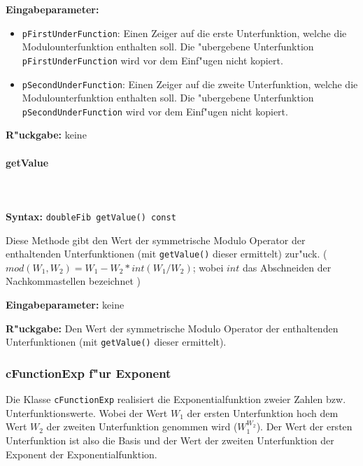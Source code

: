 \bigskip\noindent
\textbf{Eingabeparameter:}
\begin{itemize}
 \item \verb|pFirstUnderFunction|: Einen Zeiger auf die erste Unterfunktion, welche die Modulounterfunktion enthalten soll. Die "ubergebene Unterfunktion \verb|pFirstUnderFunction| wird vor dem Einf"ugen nicht kopiert.
 \item \verb|pSecondUnderFunction|: Einen Zeiger auf die zweite Unterfunktion, welche die Modulounterfunktion enthalten soll. Die "ubergebene Unterfunktion \verb|pSecondUnderFunction| wird vor dem Einf"ugen nicht kopiert.
\end{itemize}

\bigskip\noindent
\textbf{R"uckgabe:} keine


\paragraph{getValue}

\ \\\\\noindent
\textbf{Syntax:} \verb|doubleFib getValue() const|

\bigskip\noindent
Diese Methode gibt den Wert der symmetrische Modulo Operator der enthaltenden Unterfunktionen (mit \verb|getValue()| dieser ermittelt) zur"uck.
( $mod( W_1, W_2 ) = W_1 - W_2 * int(W_1/W_2)$; wobei $int$ das Abschneiden der Nachkommastellen bezeichnet )

\bigskip\noindent
\textbf{Eingabeparameter:} keine

\bigskip\noindent
\textbf{R"uckgabe:} Den Wert der symmetrische Modulo Operator der enthaltenden Unterfunktionen (mit \verb|getValue()| dieser ermittelt).




\subsubsection{cFunctionExp f"ur Exponent}

Die Klasse \verb|cFunctionExp| realisiert die Exponentialfunktion zweier Zahlen bzw. Unterfunktionswerte. Wobei der Wert $W_1$ der ersten Unterfunktion hoch dem Wert $W_2$ der zweiten Unterfunktion genommen wird ($W_1^{W_2}$). Der Wert der ersten Unterfunktion ist also die Basis und der Wert der zweiten Unterfunktion der Exponent der Exponentialfunktion.

